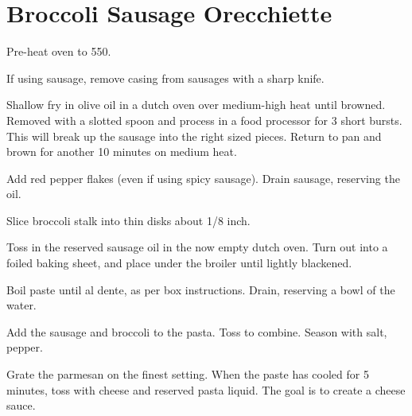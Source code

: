 \section{Broccoli Sausage Orecchiette}
\begin{recipe}



Pre-heat oven to 550\degree{}.

If using sausage, remove casing from sausages with a sharp knife.

Shallow fry in olive oil in a dutch oven over medium-high heat until
browned. Removed with a slotted spoon and process in a food processor for 3
short bursts. This will break up the sausage into the right sized pieces.
Return to pan and brown for another 10 minutes on medium heat.

Add red pepper flakes (even if using spicy sausage).
Drain sausage, reserving the oil.


Slice broccoli stalk into thin disks about 1/8 inch.

Toss in the reserved sausage oil in the now empty dutch oven. Turn out into a
foiled baking sheet, and place under the broiler until lightly blackened.


Boil paste until al dente, as per box instructions. Drain, reserving a bowl
of the water.

Add the sausage and broccoli to the pasta. Toss to combine.
Season with salt, pepper.


Grate the parmesan on the finest setting. When the paste has cooled for 5
minutes, toss with cheese and reserved pasta liquid. The goal is to create a
cheese sauce.


\end{recipe}
